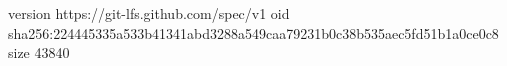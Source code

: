 version https://git-lfs.github.com/spec/v1
oid sha256:224445335a533b41341abd3288a549caa79231b0c38b535aec5fd51b1a0ce0c8
size 43840
